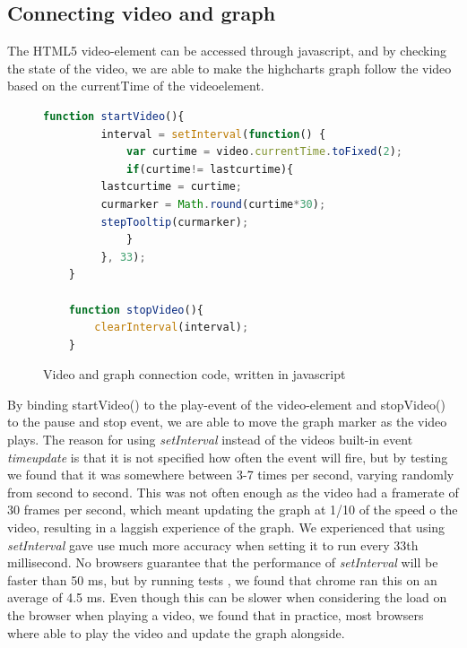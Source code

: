 \subsection{Connecting video and graph}
 The HTML5 video-element can be accessed through javascript, and by checking the state of the video, we are able to make the highcharts graph follow the video based on the currentTime of the videoelement.

\begin{figure}
	\begin{lstlisting}[language=javascript]
	function startVideo(){
	     interval = setInterval(function() {
	         var curtime = video.currentTime.toFixed(2);
	         if(curtime!= lastcurtime){
		 lastcurtime = curtime;
		 curmarker = Math.round(curtime*30);
		 stepTooltip(curmarker);
	         }
	     }, 33);
	}

	function stopVideo(){
		clearInterval(interval);
	}
	\end{lstlisting}
	\caption{Video and graph connection code, written in javascript}
	\label{fig:videocode}
\end{figure}

By binding startVideo() to the play-event of the video-element and stopVideo() to the pause and stop event, we are able to move the graph marker as the video plays. The reason for using \emph{setInterval} instead of the videos built-in event \emph{timeupdate} is that it is not specified how often the event will fire, but by testing we found that it was somewhere between 3-7 times per second, varying randomly from second to second. This was not often enough as the video had a framerate of 30 frames per second, which meant updating the graph at 1/10 of the speed o the video, resulting in a laggish experience of the graph. We experienced that using \emph{setInterval} gave use much more accuracy when setting it to run every 33th millisecond. No browsers guarantee that the performance of \emph{setInterval} will be faster than 50 ms, but by running tests \citep{adequatleyqood}, we found that chrome ran this on an average of 4.5 ms. Even though this can be slower when considering the load on the browser when playing a video, we found that in practice, most browsers where able to play the video and update the graph alongside. 
